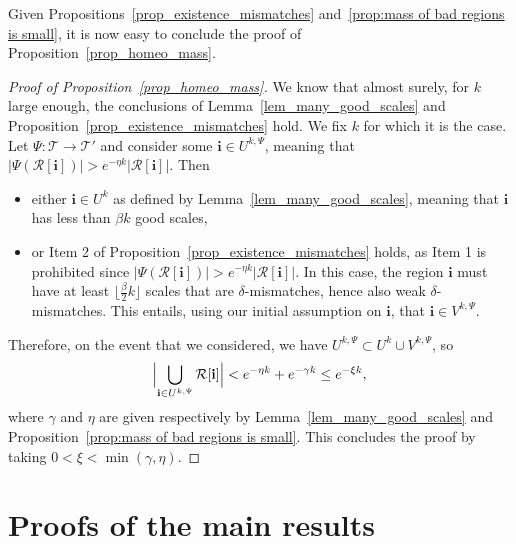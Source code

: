 \documentclass[11pt]{article}
\newcommand{\Tt}{\mathcal{T}}
\newcommand{\Rr}{\mathcal{R}}
\newcommand{\ii}{\mathbf{i}}
\theoremstyle{plain}
\theoremstyle{definition}
\numberwithin{equation}{section}
\begin{document}
Given Propositions~\ref{prop_existence_mismatches} and~\ref{prop:mass of bad regions is small}, it is now easy to conclude the proof of Proposition~\ref{prop_homeo_mass}.
\begin{proof}[Proof of Proposition~\ref{prop_homeo_mass}]
We know that almost surely, for $k$ large enough, the conclusions of Lemma~\ref{lem_many_good_scales} and Proposition~\ref{prop_existence_mismatches} hold. We fix $k$ for which it is the case.
Let $\Psi: \Tt \to \Tt'$ and consider some $\ii \in U^{k,\Psi}$, meaning that $\left| \Psi \left( \Rr[\ii] \right) \right| > e^{-\eta k} \left| \Rr[\ii] \right|$.
Then
\begin{itemize}
\item either $\ii \in U^k$ as defined by Lemma~\ref{lem_many_good_scales}, meaning that $\ii$ has less than $\beta k$ good scales,
\item or Item 2 of Proposition~\ref{prop_existence_mismatches} holds, as Item 1 is prohibited since $\left| \Psi \left( \Rr[\ii] \right) \right| > e^{-\eta k} \left| \Rr[\ii] \right|$. In this case, the region $\ii$ must have at least $\lfloor \frac{\beta}{2}k \rfloor$ scales that are $\delta$-mismatches, hence also weak $\delta$-mismatches. This entails, using our initial assumption on $\ii$, that $\ii \in V^{k,\Psi}$.
\end{itemize}
Therefore, on the event that we considered, we have $U^{k,\Psi} \subset U^k \cup V^{k,\Psi}$, so
\begin{align*}
\Bigl|\bigcup_{\ii \in U^{k,\Psi}} \Rr[\ii] \Bigr| < e^{-\eta k} + e^{-\gamma k} \leq e^{-\xi k},
\end{align*}
where $\gamma$ and $\eta$ are given respectively by Lemma~\ref{lem_many_good_scales} and Proposition~\ref{prop:mass of bad regions is small}. This concludes the proof by taking $0<\xi<\min(\gamma,\eta)$.
\end{proof}

\section{Proofs of the main results}\label{sec:proof of main results}
\end{document}
